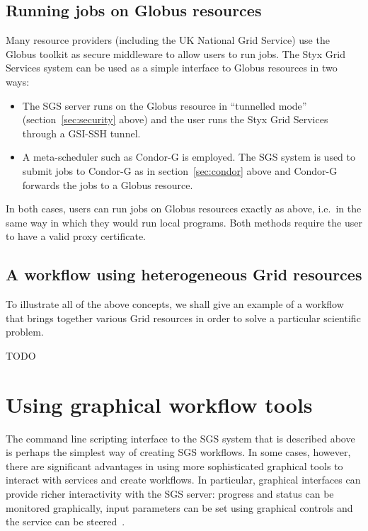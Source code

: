 \documentclass[a4paper]{article}
\begin{document}
\subsection{Running jobs on Globus resources}
Many resource providers (including the UK National Grid Service) use the Globus toolkit as secure middleware to allow users to run jobs.  The Styx Grid Services system can be used as a simple interface to Globus resources in two ways:

\begin{itemize}
	\item The SGS server runs on the Globus resource in ``tunnelled mode'' (section~\ref{sec:security} above) and the user runs the Styx Grid Services through a GSI-SSH tunnel.
	\item A meta-scheduler such as Condor-G is employed.  The SGS system is used to submit jobs to Condor-G as in section~\ref{sec:condor} above and Condor-G forwards the jobs to a Globus resource.
\end{itemize}

In both cases, users can run jobs on Globus resources exactly as above, i.e.\ in the same way in which they would run local programs.  Both methods require the user to have a valid proxy certificate.

\subsection{A workflow using heterogeneous Grid resources}
To illustrate all of the above concepts, we shall give an example of a workflow that brings together various Grid resources in order to solve a particular scientific problem.

TODO

\section{Using graphical workflow tools}\label{subsec:graphical-workflow}
The command line scripting interface to the SGS system that is described above is perhaps the simplest way of creating SGS workflows.  In some cases, however, there are significant advantages in using more sophisticated graphical tools to interact with services and create workflows.  In particular, graphical interfaces can provide richer interactivity with the SGS server: progress and status can be monitored graphically, input parameters can be set using graphical controls
and the service can be steered~\cite{blower:2005}.
\end{document}
